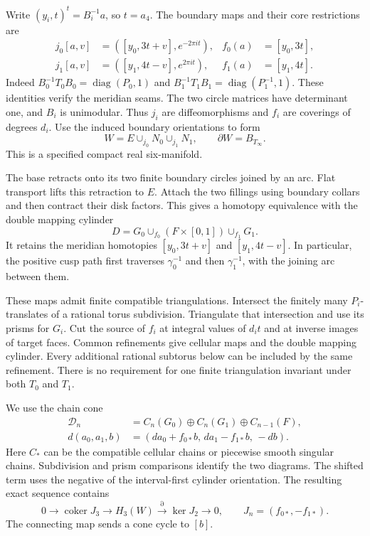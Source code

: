 Write $(y_i,t)^t=B_i^{-1}a$, so $t=a_4$.
The boundary maps and their core restrictions are
\begin{equation}\label{th:eq:maps}
\begin{aligned}
j_0[a,v]&=([y_0,3t+v],e^{-2\pi it}),&
f_0(a)&=[y_0,3t],\\
j_1[a,v]&=([y_1,4t-v],e^{2\pi it}),&
f_1(a)&=[y_1,4t].
\end{aligned}
\end{equation}
Indeed $B_0^{-1}T_0B_0=\operatorname{diag}(P_0,1)$ and
$B_1^{-1}T_1B_1=\operatorname{diag}(P_1^{-1},1)$.
These identities verify the meridian seams.
The two circle matrices have determinant one, and $B_i$ is unimodular.
Thus $j_i$ are diffeomorphisms and $f_i$ are coverings of degrees $d_i$.
Use the induced boundary orientations to form
\[
W=E\cup_{j_0}N_0\cup_{j_1}N_1,\qquad \partial W=B_{T_\infty}.
\]
This is a specified compact real six-manifold.

The base retracts onto its two finite boundary circles joined by an arc.
Flat transport lifts this retraction to $E$.
Attach the two fillings using boundary collars and then contract their disk factors.
This gives a homotopy equivalence with the double mapping cylinder
\[
D=G_0\cup_{f_0}(F\times[0,1])\cup_{f_1}G_1.
\]
It retains the meridian homotopies $[y_0,3t+v]$ and $[y_1,4t-v]$.
In particular, the positive cusp path first traverses $\gamma_0^{-1}$
and then $\gamma_1^{-1}$, with the joining arc between them.

These maps admit finite compatible triangulations.
Intersect the finitely many $P_i$-translates of a rational torus subdivision.
Triangulate that intersection and use its prisms for $G_i$.
Cut the source of $f_i$ at integral values of $d_it$ and at inverse images of target faces.
Common refinements give cellular maps and the double mapping cylinder.
Every additional rational subtorus below can be included by the same refinement.
There is no requirement for one finite triangulation invariant under both $T_0$ and $T_1$.

We use the chain cone
\begin{equation}\label{th:eq:cone}
\begin{aligned}
\mathcal D_n&=C_n(G_0)\oplus C_n(G_1)\oplus C_{n-1}(F),\\
d(a_0,a_1,b)&=(da_0+f_{0*}b,\,da_1-f_{1*}b,\,-db).
\end{aligned}
\end{equation}
Here $C_*$ can be the compatible cellular chains or piecewise smooth singular chains.
Subdivision and prism comparisons identify the two diagrams.
The shifted term uses the negative of the interval-first cylinder orientation.
The resulting exact sequence contains
\begin{equation}\label{th:eq:sequence}
0\longrightarrow\operatorname{coker}J_3
\longrightarrow H_3(W)\xrightarrow{\partial}\ker J_2
\longrightarrow0,\qquad J_n=(f_{0*},-f_{1*}).
\end{equation}
The connecting map sends a cone cycle to $[b]$.

